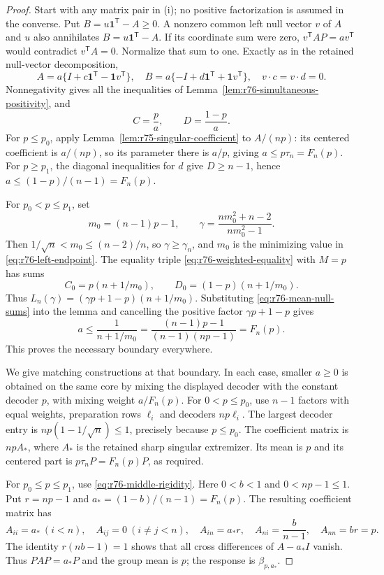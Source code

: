 \begin{proof}
Start with any matrix pair in (i); no positive factorization is assumed
in the converse. Put $B=u\mathbf1^{\mathsf T}-A\ge0$.
A nonzero common left null vector $v$ of $A$ and $u$ also
annihilates $B=u\mathbf1^{\mathsf T}-A$. If its coordinate sum were
zero, $v^{\mathsf T}AP=a v^{\mathsf T}$ would contradict
$v^{\mathsf T}A=0$. Normalize that sum to one.
Exactly as in the retained null-vector decomposition,
\[
 A=a\{I+c\mathbf1^{\mathsf T}-\mathbf1v^{\mathsf T}\},\quad
 B=a\{-I+d\mathbf1^{\mathsf T}+\mathbf1v^{\mathsf T}\},
 \quad v\cdot c=v\cdot d=0.
\]
Nonnegativity gives all the inequalities of
Lemma~\ref{lem:r76-simultaneous-positivity}, and
\begin{equation}\label{eq:r76-mean-null-sums}
 C=\frac pa,\qquad D=\frac{1-p}{a}.
\end{equation}
For $p\le p_0$, apply Lemma~\ref{lem:r75-singular-coefficient} to
$A/(np)$: its centered coefficient is $a/(np)$, so its parameter
there is $a/p$, giving $a\le p\tau_n=F_n(p)$.
For $p\ge p_1$, the diagonal inequalities for $d$ give $D\ge n-1$,
hence $a\le(1-p)/(n-1)=F_n(p)$.

For $p_0<p\le p_1$, set
\[
 m_0=(n-1)p-1,\qquad
 \gamma=\frac{n m_0^2+n-2}{n m_0^2-1}.
\]
Then $1/\sqrt n<m_0\le(n-2)/n$, so
$\gamma\ge\gamma_n$, and $m_0$ is the minimizing value in
\eqref{eq:r76-left-endpoint}. The equality triple
\eqref{eq:r76-weighted-equality} with $M=p$ has sums
\[
 C_0=p(n+1/m_0),\qquad D_0=(1-p)(n+1/m_0).
\]
Thus $L_n(\gamma)=(\gamma p+1-p)(n+1/m_0)$.
Substituting \eqref{eq:r76-mean-null-sums} into the lemma and cancelling
the positive factor $\gamma p+1-p$ gives
\[
 a\le\frac1{n+1/m_0}
     =\frac{(n-1)p-1}{(n-1)(np-1)}=F_n(p).
\]
This proves the necessary boundary everywhere.

We give matching constructions at that boundary. In each case, smaller
$a\ge0$ is obtained on the same core by mixing the displayed decoder
with the constant decoder $p$, with mixing weight $a/F_n(p)$.
For $0<p\le p_0$, use $n-1$ factors with equal weights,
preparation rows $\ell_i$ and decoders $np\ell_i$. The largest decoder
entry is $np(1-1/\sqrt n)\le1$, precisely because $p\le p_0$.
The coefficient matrix is $np A_*$, where $A_*$ is the retained
sharp singular extremizer. Its mean is $p$ and its centered part is
$p\tau_nP=F_n(p)P$, as required.

For $p_0\le p\le p_1$, use \eqref{eq:r76-middle-rigidity}.
Here $0<b<1$ and $0<np-1\le1$. Put $r=np-1$ and
$a_*=(1-b)/(n-1)=F_n(p)$. The resulting coefficient matrix has
\[
 A_{ii}=a_*\ (i<n),\quad A_{ij}=0\ (i\ne j<n),\quad
 A_{in}=a_*r,\quad A_{ni}=\frac b{n-1},\quad A_{nn}=br=p.
\]
The identity $r(nb-1)=1$ shows that all cross differences of
$A-a_*I$ vanish. Thus $PA P=a_*P$ and the group mean is $p$;
the response is $\beta_{p,a_*}$.


\end{proof}
